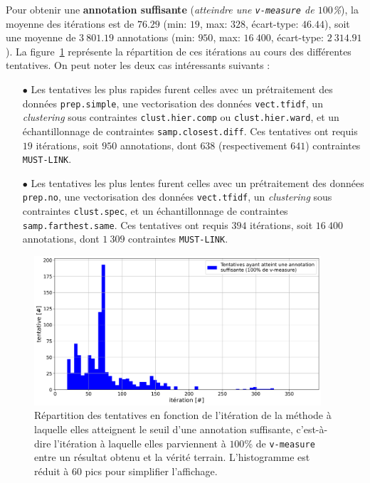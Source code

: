 			Pour obtenir une \textbf{annotation suffisante} (\textit{atteindre une \texttt{v-measure} de $100$\%}), la moyenne des itérations est de $76.29$ (min: $19$, max: $328$, écart-type: $46.44$), soit une moyenne de $3~801.19$ annotations (min: $950$, max: $16~400$, écart-type: $2~314.91$).
			La figure~\ref{figure:4.2.1-ETUDE-OPTIMISATION-HISTOGRAMME-ANNOTATION-SUFFISANTE} représente la répartition de ces itérations au cours des différentes tentatives.
			On peut noter les deux cas intéressants suivants :
			\begin{itemize}
				\item[$\bullet$] Les tentatives les plus rapides furent celles avec un prétraitement des données \texttt{prep.simple}, une vectorisation des données \texttt{vect.tfidf}, un \textit{clustering} sous contraintes \texttt{clust.hier.comp} ou \texttt{clust.hier.ward}, et un échantillonnage de contraintes \texttt{samp.closest.diff}. Ces tentatives ont requis $19$ itérations, soit $950$ annotations, dont $638$ (respectivement $641$) contraintes \texttt{MUST-LINK}.
				\item[$\bullet$] Les tentatives les plus lentes furent celles avec un prétraitement des données \texttt{prep.no}, une vectorisation des données \texttt{vect.tfidf}, un \textit{clustering} sous contraintes \texttt{clust.spec}, et un échantillonnage de contraintes \texttt{samp.farthest.same}. Ces tentatives ont requis $394$ itérations, soit $16~400$ annotations, dont $1~309$ contraintes \texttt{MUST-LINK}.
			\end{itemize}
			\begin{figure}[!htb]
				\centering
				\includegraphics[width=0.95\textwidth]{figures/etude-efficience-histogramme-annotation-suffisante}
				\caption{Répartition des tentatives en fonction de l'itération de la méthode à laquelle elles atteignent le seuil d'une annotation suffisante, c'est-à-dire l'itération à laquelle elles parviennent à $100$\% de \texttt{v-measure} entre un résultat obtenu et la vérité terrain. L'histogramme est réduit à $60$ pics pour simplifier l'affichage.}
				\label{figure:4.2.1-ETUDE-OPTIMISATION-HISTOGRAMME-ANNOTATION-SUFFISANTE}
			\end{figure}
